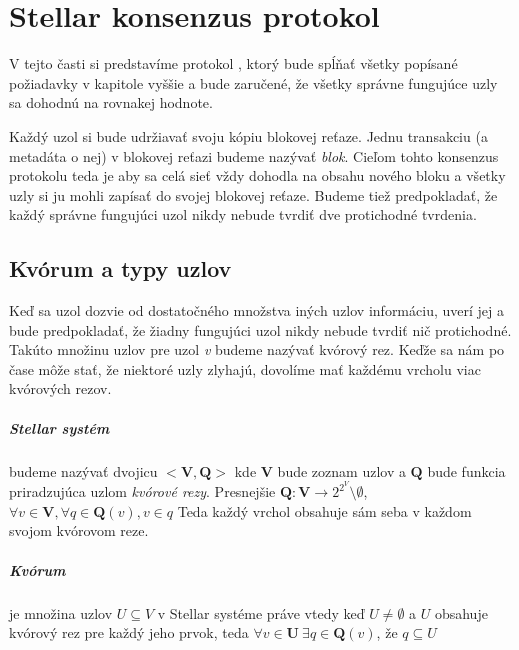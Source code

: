 \chapter{Stellar konsenzus protokol}

\label{kap:stellar}

V tejto časti si predstavíme protokol \cite{mazieres2015stellar}, ktorý bude
spĺňať všetky popísané požiadavky v kapitole vyššie a bude zaručené,
že všetky správne fungujúce uzly sa dohodnú na rovnakej hodnote.

Každý uzol si bude udržiavať svoju kópiu blokovej reťaze. Jednu transakciu (a
metadáta o nej) v blokovej reťazi budeme nazývať \textit{blok}.
Cieľom tohto konsenzus protokolu teda je aby sa celá sieť vždy dohodla
na obsahu nového bloku a všetky uzly si ju mohli zapísať do svojej
blokovej reťaze. 
Budeme tiež predpokladať, že každý správne fungujúci uzol nikdy nebude tvrdiť
dve protichodné tvrdenia.

\section {Kvórum a typy uzlov}

Keď sa uzol dozvie od dostatočného množstva iných uzlov informáciu, uverí jej a
bude predpokladať, že žiadny fungujúci uzol nikdy nebude tvrdiť nič protichodné.
Takúto množinu uzlov pre uzol \textit{v} budeme nazývať kvórový rez. Keďže
sa nám po čase môže stať, že niektoré uzly zlyhajú, dovolíme mať každému vrcholu
viac kvórových rezov.

\paragraph {Stellar systém} budeme nazývať
dvojicu $<\textbf{V},\textbf{Q}>$ kde $\textbf{V}$ bude zoznam uzlov a $\textbf
{Q}$ bude funkcia priradzujúca uzlom \textit{kvórové rezy}.
\newline
Presnejšie $\textbf{Q} : \textbf{V} \to 2^{2^V} \setminus \emptyset$, \:
$\forall v \in \textbf{V}, \forall q \in \textbf{Q}(v), v \in q$
\newline
Teda každý vrchol obsahuje sám seba v každom svojom kvórovom reze.

\paragraph {Kvórum} je množina uzlov $U \subseteq V$ v
Stellar systéme práve vtedy keď $U \neq \emptyset$ a $U$ obsahuje kvórový rez pre
každý jeho prvok, teda $\forall v \in \textbf{U} \: \exists q \in \textbf{Q}
(v)$,
že $q \subseteq U$

